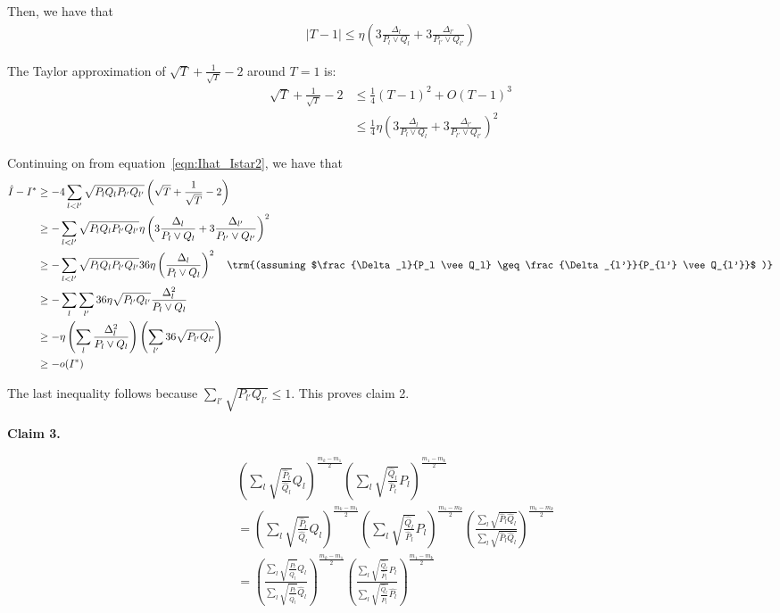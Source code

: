 \documentclass{article}
\begin{document}

Then, we have that
\begin{align*}
|T - 1| \leq \eta \left( 3 \frac{\Delta_l}{P_l \vee Q_l} + 3 \frac{\Delta_{l'}}{P_{l'} \vee Q_{l'}} \right) 
\end{align*}

The Taylor approximation of $\sqrt{T} + \frac{1}{\sqrt{T}} - 2$ around $T=1$ is:
\begin{align*}
\sqrt{T} + \frac{1}{\sqrt{T}} -2  &\leq 
  \frac{1}{4} (T - 1)^2 + O (T-1)^3 \\
 &\leq \frac{1}{4} \eta \left( 3 \frac{\Delta_l}{P_l \vee Q_l} + 3 \frac{\Delta_{l'}}{P_{l'} \vee Q_{l'}} \right)^2 
\end{align*}

Continuing on from equation~\ref{eqn:Ihat_Istar2}, we have that
\begin{align*}
\hat{I} - I^* &\geq - 4 \sum_{l < l'} \sqrt{P_l Q_l P_{l'} Q_{l'}} 
    \left( \sqrt{T} + \frac{1}{\sqrt{T}} - 2 \right) \\
  &\geq - \sum_{l < l'} \sqrt{P_l Q_l P_{l'} Q_{l'}} 
    \eta \left( 3 \frac{\Delta_l}{P_l \vee Q_l} + 3 \frac{\Delta_{l'} }{P_{l'} \vee Q_{l'}} 
     \right)^2 \\
 &\geq - \sum_{l < l'} \sqrt{P_l Q_l P_{l'} Q_{l'}} 
           36 \eta \left( \frac{\Delta_l}{ P_l \vee Q_l} \right)^2 
    \quad \trm{(assuming $\frac{\Delta_l}{P_l \vee Q_l} \geq 
                 \frac{\Delta_{l'}}{P_{l'} \vee Q_{l'}}$ )} \\
 &\geq - \sum_l \sum_{l'} 36 \eta \sqrt{P_{l'}Q_{l'}} \frac{\Delta_l^2}{P_l \vee Q_l} \\
 &\geq - \eta \left( \sum_l \frac{\Delta_l^2}{P_l \vee Q_l} \right)
         \left( \sum_{l'} 36 \sqrt{P_{l'}Q_{l'}} \right) \\
 &\geq - o(I^*)
\end{align*}

The last inequality follows because $\sum_{l'} \sqrt{P_{l'} Q_{l'}} \leq 1$. This proves claim 2.

\textbf{Claim 3.} 

\begin{align*}
& \left( \sum_l \sqrt{\frac{\hat{P}_l}{\hat{Q}_l}} Q_l \right)^{\frac{m_k - m_1}{2}} 
 \left( \sum_l \sqrt{\frac{\hat{Q}_l}{\hat{P}_l}} P_l \right)^{\frac{m_1 - m_k}{2}} \\
&= \left( \sum_l \sqrt{\frac{\hat{P}_l}{\hat{Q}_l}} Q_l \right)^{\frac{m_k - m_1}{2}} 
 \left( \sum_l \sqrt{\frac{\hat{Q}_l}{\hat{P}_l}} P_l \right)^{\frac{m_1 - m_k}{2}} 
   \left( \frac{\sum_l \sqrt{\hat{P}_l \hat{Q}_l}}{\sum_l \sqrt{\hat{P}_l \hat{Q}_l}} \right)^{\frac{m_1 - m_k}{2}} \\
&=  \left( 
   \frac{\sum_l \sqrt{\frac{\hat{P}_l}{\hat{Q}_l}} Q_l}
        {\sum_l \sqrt{\frac{\hat{P}_l}{\hat{Q}_l}} \hat{Q}_l} 
     \right)^{\frac{m_k - m_1}{2}} 
   \left( \frac{\sum_l \sqrt{\frac{\hat{Q}_l}{\hat{P}_l}} P_l}
         {\sum_l \sqrt{\frac{\hat{Q}_l}{\hat{P}_l}} \hat{P_l} } \right)^{\frac{m_1 - m_k}{2}} 
\end{align*}
\end{document}
